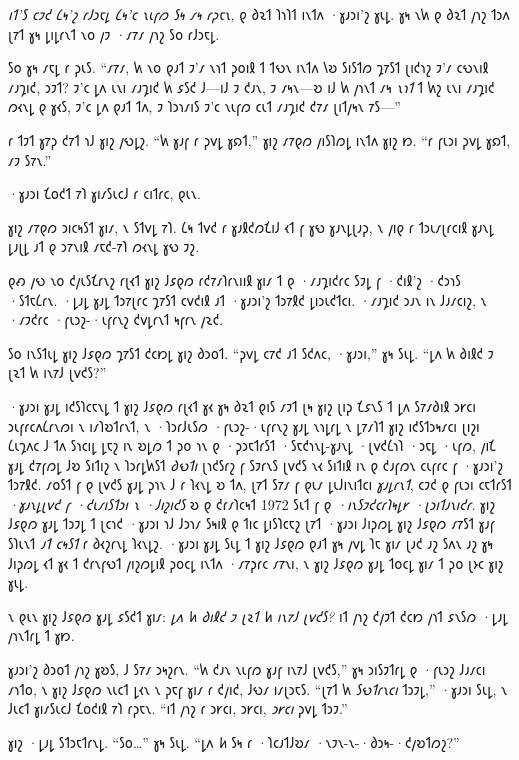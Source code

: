 \emph{𐑦𐑑'𐑕 𐑤𐑲𐑒 𐑖𐑰'𐑟 𐑩𐑓𐑮𐑱𐑛 𐑖𐑰'𐑤 𐑯𐑧𐑝𐑼 𐑕𐑰 𐑥𐑰 𐑩𐑜𐑱𐑯,} 𐑞 𐑔𐑷𐑑 𐑐𐑪𐑐𐑑 𐑦𐑯𐑑𐑵 ·𐑣𐑨𐑮𐑦'𐑟 𐑣𐑧𐑛. 𐑣𐑰 𐑯𐑿 𐑞 𐑔𐑷𐑑 𐑢𐑪𐑟 𐑑𐑮𐑵 𐑚𐑳𐑑 𐑣𐑰 𐑛𐑦𐑛𐑩𐑯𐑑 𐑯𐑴 𐑢𐑲 ·𐑥𐑳𐑥 𐑢𐑪𐑟 𐑕𐑴 𐑩𐑓𐑮𐑱𐑛.

𐑕𐑴 𐑣𐑰 𐑥𐑱𐑛 𐑩 𐑜𐑧𐑕. “𐑥𐑳𐑥, 𐑿 𐑯𐑴 𐑞𐑨𐑑 𐑲'𐑥 𐑯𐑪𐑑 𐑜𐑴𐑦𐑙 𐑑 𐑑𐑻𐑯 𐑦𐑯𐑑𐑵 𐑘𐑹 𐑕𐑦𐑕𐑑𐑼 𐑡𐑳𐑕𐑑 𐑚𐑦𐑒𐑪𐑟 𐑲'𐑥 𐑤𐑻𐑯𐑦𐑙 𐑥𐑨𐑡𐑦𐑒, 𐑮𐑲𐑑? 𐑲'𐑤 𐑛𐑵 𐑧𐑯𐑦 𐑥𐑨𐑡𐑦𐑒 𐑿 𐑭𐑕𐑒 𐑓—𐑦𐑓 𐑲 𐑒𐑨𐑯, 𐑲 𐑥𐑰𐑯—𐑹 𐑦𐑓 𐑿 𐑢𐑪𐑯𐑑 𐑥𐑰 \emph{𐑯𐑪𐑑} 𐑑 𐑿𐑟 𐑧𐑯𐑦 𐑥𐑨𐑡𐑦𐑒 𐑼𐑬𐑯𐑛 𐑞 𐑣𐑬𐑕, 𐑲'𐑤 𐑛𐑵 𐑞𐑨𐑑 𐑑𐑵, 𐑲 𐑐𐑮𐑪𐑥𐑦𐑕 𐑲'𐑤 𐑯𐑧𐑝𐑼 𐑤𐑧𐑑 𐑥𐑨𐑡𐑦𐑒 𐑒𐑳𐑥 𐑚𐑦𐑑𐑢𐑰𐑯 𐑳𐑕—”

𐑩 𐑑𐑲𐑑 𐑣𐑳𐑜 𐑒𐑳𐑑 𐑪𐑓 𐑣𐑦𐑟 𐑢𐑻𐑛𐑟. “𐑿 𐑣𐑨𐑝 𐑩 𐑜𐑫𐑛 𐑣𐑸𐑑,” 𐑣𐑦𐑟 𐑥𐑳𐑞𐑼 𐑢𐑦𐑕𐑐𐑼𐑛 𐑦𐑯𐑑𐑵 𐑣𐑦𐑟 𐑽. “𐑩 𐑝𐑧𐑮𐑦 𐑜𐑫𐑛 𐑣𐑸𐑑, 𐑥𐑲 𐑕𐑳𐑯.”

·𐑣𐑨𐑮𐑦 𐑗𐑴𐑒𐑑 𐑳𐑐 𐑣𐑦𐑥𐑕𐑧𐑤𐑓 𐑩 𐑤𐑦𐑑𐑩𐑤, 𐑞𐑧𐑯.

𐑣𐑦𐑟 𐑥𐑳𐑞𐑼 𐑮𐑦𐑤𐑰𐑕𐑑 𐑣𐑦𐑥, 𐑯 𐑕𐑑𐑫𐑛 𐑳𐑐. 𐑖𐑰 𐑑𐑫𐑒 𐑩 𐑣𐑨𐑙𐑒𐑼𐑗𐑦𐑓 𐑬𐑑 𐑝 𐑣𐑻 𐑣𐑨𐑯𐑛𐑚𐑨𐑜, 𐑯 𐑢𐑦𐑞 𐑩 𐑑𐑮𐑧𐑥𐑚𐑩𐑤𐑦𐑙 𐑣𐑨𐑯𐑛 𐑛𐑨𐑚𐑛 𐑨𐑑 𐑞 𐑮𐑳𐑯𐑦𐑙 𐑥𐑱𐑒-𐑳𐑐 𐑼𐑬𐑯𐑛 𐑣𐑻 𐑲𐑟.

𐑞𐑺 𐑢𐑻 𐑯𐑴 𐑒𐑢𐑧𐑕𐑗𐑩𐑯𐑟 𐑩𐑚𐑬𐑑 𐑣𐑦𐑟 𐑓𐑭𐑞𐑼 𐑩𐑒𐑳𐑥𐑐𐑩𐑯𐑦𐑦𐑙 𐑣𐑦𐑥 𐑑 𐑞 ·𐑥𐑨𐑡𐑦𐑒𐑩𐑤 𐑕𐑲𐑛 𐑝 ·𐑒𐑦𐑙'𐑟 ·𐑒𐑮𐑪𐑕 ·𐑕𐑑𐑱𐑖𐑩𐑯. ·𐑛𐑨𐑛 𐑣𐑨𐑛 𐑑𐑮𐑳𐑚𐑩𐑤 𐑡𐑳𐑕𐑑 𐑤𐑫𐑒𐑦𐑙 𐑨𐑑 ·𐑣𐑨𐑮𐑦'𐑟 𐑑𐑮𐑳𐑙𐑒 𐑛𐑦𐑮𐑧𐑒𐑑𐑤𐑦. ·𐑥𐑨𐑡𐑦𐑒 𐑮𐑨𐑯 𐑦𐑯 𐑓𐑨𐑥𐑤𐑦𐑟, 𐑯 ·𐑥𐑲𐑒𐑩𐑤 ·𐑝𐑧𐑮𐑟-·𐑧𐑝𐑩𐑯𐑟 𐑒𐑫𐑛𐑩𐑯𐑑 𐑰𐑝𐑩𐑯 𐑢𐑷𐑒.

𐑕𐑴 𐑦𐑯𐑕𐑑𐑧𐑛 𐑣𐑦𐑟 𐑓𐑭𐑞𐑼 𐑡𐑳𐑕𐑑 𐑒𐑤𐑽𐑛 𐑣𐑦𐑟 𐑔𐑮𐑴𐑑. “𐑜𐑫𐑛 𐑤𐑳𐑒 𐑨𐑑 𐑕𐑒𐑵𐑤, ·𐑣𐑨𐑮𐑦,” 𐑣𐑰 𐑕𐑧𐑛. “𐑛𐑵 𐑿 𐑔𐑦𐑙𐑒 𐑲 𐑚𐑷𐑑 𐑿 𐑦𐑯𐑳𐑓 𐑚𐑫𐑒𐑕?”

·𐑣𐑨𐑮𐑦 𐑣𐑨𐑛 𐑦𐑒𐑕𐑐𐑤𐑱𐑯𐑛 𐑑 𐑣𐑦𐑟 𐑓𐑭𐑞𐑼 𐑩𐑚𐑬𐑑 𐑣𐑬 𐑣𐑰 𐑔𐑷𐑑 𐑞𐑦𐑕 𐑥𐑲𐑑 𐑚𐑰 𐑣𐑦𐑟 𐑚𐑦𐑜 𐑗𐑭𐑯𐑕 𐑑 𐑛𐑵 𐑕𐑳𐑥𐑔𐑦𐑙 𐑮𐑾𐑤𐑦 𐑮𐑧𐑝𐑩𐑤𐑵𐑖𐑩𐑯𐑼𐑦 𐑯 𐑦𐑥𐑐𐑹𐑑𐑩𐑯𐑑, 𐑯 ·𐑐𐑮𐑩𐑓𐑧𐑕𐑼 ·𐑝𐑧𐑮𐑟-·𐑧𐑝𐑩𐑯𐑟 𐑣𐑨𐑛 𐑯𐑪𐑛𐑩𐑛 𐑯 𐑛𐑳𐑥𐑐𐑑 𐑣𐑦𐑟 𐑦𐑒𐑕𐑑𐑮𐑰𐑥𐑤𐑦 𐑚𐑦𐑟𐑦 𐑖𐑧𐑡𐑵𐑤 𐑓 𐑑𐑵 𐑕𐑪𐑤𐑦𐑛 𐑛𐑱𐑟 𐑦𐑯 𐑹𐑛𐑼 𐑑 𐑜𐑴 𐑪𐑯 𐑞 ·𐑜𐑮𐑱𐑑𐑩𐑕𐑑 ·𐑕𐑱𐑒𐑪𐑯𐑛-𐑣𐑨𐑯𐑛 ·𐑚𐑫𐑒𐑖𐑪𐑐 ·𐑮𐑱𐑛 ·𐑧𐑝𐑼, 𐑢𐑦𐑗 𐑣𐑨𐑛 𐑒𐑳𐑝𐑼𐑛 𐑓𐑹 𐑕𐑦𐑑𐑦𐑟 𐑯 𐑐𐑮𐑩𐑛𐑿𐑕𐑑 \emph{𐑔𐑻𐑑𐑦} 𐑚𐑪𐑒𐑕𐑩𐑟 𐑝 𐑕𐑲𐑩𐑯𐑕 𐑚𐑫𐑒𐑕 𐑯𐑬 𐑕𐑦𐑑𐑦𐑙 𐑦𐑯 𐑞 𐑒𐑨𐑝𐑼𐑯 𐑤𐑧𐑝𐑩𐑤 𐑝 ·𐑣𐑨𐑮𐑦'𐑟 𐑑𐑮𐑳𐑙𐑒. 𐑥𐑴𐑕𐑑 𐑝 𐑞 𐑚𐑫𐑒𐑕 𐑣𐑨𐑛 𐑜𐑪𐑯 𐑓 𐑩 𐑐𐑬𐑯𐑛 𐑹 𐑑𐑵, 𐑚𐑳𐑑 𐑕𐑳𐑥 𐑝 𐑞𐑧𐑥 𐑛𐑧𐑓𐑦𐑯𐑦𐑑𐑤𐑦 \emph{𐑣𐑨𐑛𐑩𐑯𐑑}, 𐑤𐑲𐑒 𐑞 𐑝𐑧𐑮𐑦 𐑤𐑱𐑑𐑩𐑕𐑑 \emph{·𐑣𐑨𐑯𐑛𐑚𐑫𐑒 𐑝 ·𐑒𐑧𐑥𐑦𐑕𐑑𐑮𐑦 𐑯 ·𐑓𐑦𐑟𐑦𐑒𐑕} 𐑹 𐑞 𐑒𐑩𐑥𐑐𐑤𐑰𐑑 1972 𐑕𐑧𐑑 𐑝 𐑞 \emph{·𐑦𐑯𐑕𐑲𐑒𐑤𐑩𐑐𐑰𐑛𐑾 ·𐑚𐑮𐑦𐑑𐑨𐑯𐑦𐑒𐑩.} 𐑣𐑦𐑟 𐑓𐑭𐑞𐑼 𐑣𐑨𐑛 𐑑𐑮𐑲𐑛 𐑑 𐑚𐑤𐑪𐑒 ·𐑣𐑨𐑮𐑦 𐑪𐑓 𐑓𐑮𐑪𐑥 𐑕𐑰𐑦𐑙 𐑞 𐑑𐑦𐑤 𐑛𐑦𐑕𐑐𐑤𐑱𐑟 𐑚𐑳𐑑 ·𐑣𐑨𐑮𐑦 𐑓𐑦𐑜𐑼𐑛 𐑣𐑦𐑟 𐑓𐑭𐑞𐑼 𐑥𐑳𐑕𐑑 𐑣𐑨𐑝 𐑕𐑐𐑧𐑯𐑑 \emph{𐑨𐑑 𐑤𐑰𐑕𐑑} 𐑩 𐑔𐑬𐑟𐑩𐑯𐑛 𐑐𐑬𐑯𐑛𐑟. ·𐑣𐑨𐑮𐑦 𐑣𐑨𐑛 𐑕𐑧𐑛 𐑑 𐑣𐑦𐑟 𐑓𐑭𐑞𐑼 𐑞𐑨𐑑 𐑣𐑰 𐑢𐑫𐑛 𐑐𐑱 𐑣𐑦𐑥 𐑚𐑨𐑒 𐑨𐑟 𐑕𐑵𐑯 𐑨𐑟 𐑣𐑰 𐑓𐑦𐑜𐑼𐑛 𐑬𐑑 𐑣𐑬 𐑑 𐑒𐑩𐑯𐑝𐑻𐑑 𐑢𐑦𐑟𐑼𐑛𐑦𐑙 𐑜𐑴𐑤𐑛 𐑦𐑯𐑑𐑵 ·𐑥𐑳𐑜𐑩𐑤 𐑥𐑳𐑯𐑦, 𐑯 𐑣𐑦𐑟 𐑓𐑭𐑞𐑼 𐑣𐑨𐑛 𐑑𐑴𐑤𐑛 𐑣𐑦𐑥 𐑑 𐑜𐑴 𐑚𐑶𐑤 𐑣𐑦𐑟 𐑣𐑧𐑛.

𐑯 𐑞𐑧𐑯 𐑣𐑦𐑟 𐑓𐑭𐑞𐑼 𐑣𐑨𐑛 𐑭𐑕𐑒𐑑 𐑣𐑦𐑥: \emph{𐑛𐑵 𐑿 𐑔𐑦𐑙𐑒 𐑲 𐑚𐑷𐑑 𐑿 𐑦𐑯𐑳𐑓 𐑚𐑫𐑒𐑕?} 𐑦𐑑 𐑢𐑪𐑟 𐑒𐑢𐑲𐑑 𐑒𐑤𐑽 𐑢𐑪𐑑 𐑭𐑯𐑕𐑼 ·𐑛𐑨𐑛 𐑢𐑪𐑯𐑑𐑩𐑛 𐑑 𐑣𐑽.

𐑣𐑨𐑮𐑦'𐑟 𐑔𐑮𐑴𐑑 𐑢𐑪𐑟 𐑣𐑹𐑕, 𐑓 𐑕𐑳𐑥 𐑮𐑰𐑟𐑩𐑯. “𐑿 𐑒𐑨𐑯 𐑯𐑧𐑝𐑼 𐑣𐑨𐑝 𐑦𐑯𐑳𐑓 𐑚𐑫𐑒𐑕,” 𐑣𐑰 𐑮𐑦𐑕𐑲𐑑𐑩𐑛 𐑞 ·𐑝𐑧𐑮𐑟 𐑓𐑨𐑥𐑤𐑦 𐑥𐑪𐑑𐑴, 𐑯 𐑣𐑦𐑟 𐑓𐑭𐑞𐑼 𐑯𐑧𐑤𐑑 𐑛𐑬𐑯 𐑯 𐑜𐑱𐑝 𐑣𐑦𐑥 𐑩 𐑒𐑢𐑦𐑒, 𐑓𐑻𐑥 𐑦𐑥𐑚𐑮𐑱𐑕. “𐑚𐑳𐑑 𐑿 \emph{𐑕𐑻𐑑𐑩𐑯𐑤𐑦} 𐑑𐑮𐑲𐑛,” ·𐑣𐑨𐑮𐑦 𐑕𐑧𐑛, 𐑯 𐑓𐑧𐑤𐑑 𐑣𐑦𐑥𐑕𐑧𐑤𐑓 𐑗𐑴𐑒𐑦𐑙 𐑳𐑐 𐑩𐑜𐑱𐑯. “𐑦𐑑 𐑢𐑪𐑟 𐑩 𐑮𐑾𐑤𐑦, 𐑮𐑾𐑤𐑦, \emph{𐑮𐑾𐑤𐑦} 𐑜𐑫𐑛 𐑑𐑮𐑲.”

𐑣𐑦𐑟 ·𐑛𐑨𐑛 𐑕𐑑𐑮𐑱𐑑𐑩𐑯𐑛. “𐑕𐑴…” 𐑣𐑰 𐑕𐑧𐑛. “𐑛𐑵 \emph{𐑿} 𐑕𐑰 𐑩 ·𐑐𐑤𐑨𐑑𐑓𐑹𐑥 ·𐑯𐑲𐑯-𐑯-·𐑔𐑮𐑰-·𐑒𐑢𐑹𐑑𐑼𐑟?”

